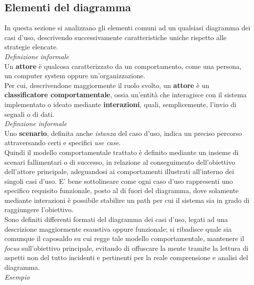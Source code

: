 \documentclass{article}
\begin{document}
\subsection*{Elementi del diagramma}
In questa sezione si analizzano gli elementi comuni ad un qualsiasi diagramma dei casi d'uso, descrivendo successivamente caratteristiche uniche rispetto alle strategie elencate.\vspace*{14pt}\\
\textit{Definizione informale}\\
Un \textbf{attore} è qualcosa caratterizzato da un comportamento, come una persona, un computer system oppure un'organizzazione.\vspace*{14pt}\\
Per cui, descrivendone maggiormente il ruolo svolto, un \textbf{attore} è un \textbf{classificatore comportamentale}, ossia un'entità che interagisce con il sistema implementato o ideato mediante \textbf{interazioni}, quali, semplicemente, l'invio di segnali o di dati.\vspace*{14pt}\\
\textit{Definzione informale}\\
Uno \textbf{scenario}, definita anche \textit{istanza} del caso d'uso, indica un preciso percorso attraversando certi e specifici \textit{use case}.\vspace*{14pt}\\
Quindi il modello comportamentale trattato è definito mediante un insieme di scenari fallimentari o di successo, in relazione al conseguimento dell'obiettivo dell'attore principale, adeguandosi ai comportamenti illustrati all'interno dei singoli casi d'uso. E' bene sottolineare come ogni caso d'uso rappresenti uno specifico requisito funzionale, posto al di fuori del diagramma, dove solamente mediante interazioni è possibile stabilire un path per cui il sistema sia in grado di raggiungere l'obiettivo.\\
Sono definiti differenti formati del diagramma dei casi d'uso, legati ad una descrizione maggiormente esaustiva oppure funzionale; si ribadisce quale sia comunque il caposaldo su cui regge tale modello comportamentale, mantenere il \textit{focus} sull'obiettivo principale, evitando di offuscare la mente tramite la lettura di aspetti non del tutto incidenti e pertinenti per la reale comprensione e analisi del diagramma.\vspace*{14pt}\\
\textit{Esempio}\vspace*{2pt}\\
\end{document}
